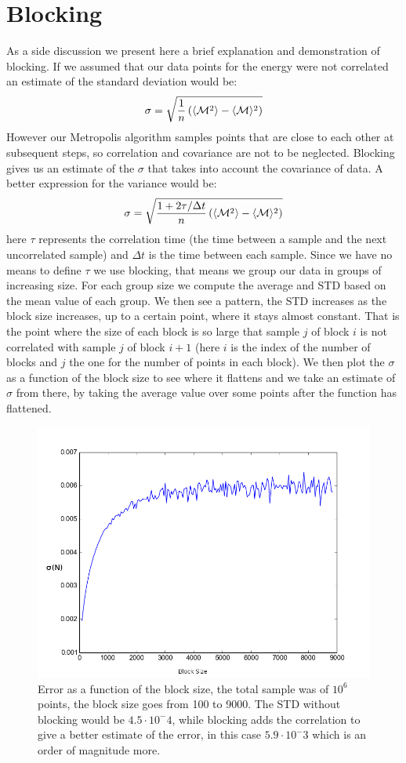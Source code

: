 \documentclass[10pt,a4paper,titlepage]{article}
\begin{document}
\section*{Blocking}
\noindent As a side discussion we present here a brief explanation and demonstration of blocking. If we assumed that our data points for the energy were not correlated an estimate of the standard deviation would be:
\[
\sigma=\sqrt{\frac{1}{n}\left(\langle {\cal M}^2\rangle-\langle {\cal M}\rangle^2\right)} 
\]
However our Metropolis algorithm samples points that are close to each other at subsequent steps, so correlation and covariance are not to be neglected. Blocking gives us an estimate of the $\sigma$ that takes into account the covariance of data. A better expression for the variance would be:
\[
\sigma=\sqrt{\frac{1+2\tau/\Delta t}{n}\left(\langle {\cal M}^2\rangle-\langle {\cal M}\rangle^2\right)}
\]
here $\tau$ represents the correlation time (the time between a sample and the next uncorrelated sample) and $\Delta t$ is the time between each sample. Since we have no means to define $\tau$ we use blocking, that means we group our data in groups of increasing size. For each group size we compute the average and STD based on the mean value of each group. We then see a pattern, the STD increases as the block size increases, up to a certain point, where it stays almost constant. That is the point where the size of each block is so large that sample $j$ of block $i$ is not correlated with sample $j$ of block $i+1$ (here $i$ is the index of the number of blocks and $j$ the one for the number of points in each block). We then plot the $\sigma$ as a function of the block size to see where it flattens and we take an estimate of  $\sigma$ from there, by taking the average value over some points after the function has flattened. 
\begin{center}
\begin{figure}[H]
 \centering
  \includegraphics[width=.9\linewidth]{figure_1.png}
\caption{{\footnotesize Error as a function of the block size, the total sample was of $10^6$ points, the block size goes from 100 to 9000. The STD without blocking would be $4.5\cdot 10^-4$, while blocking adds the correlation to give a better estimate of the error, in this case $5.9 \cdot 10^-3$ which is an order of magnitude more.}}
\label{fig:fig6}
\end{figure}
\end{center}
\end{document}
